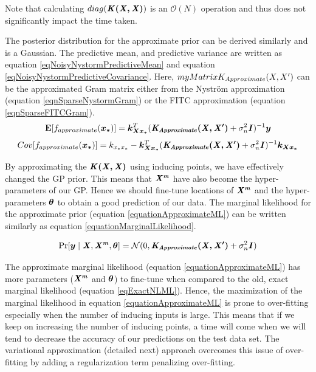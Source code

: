 Note that calculating $diag(\bm{\mathit{K(X, X)}})$ is an $\mathcal{O}\left ( N \right )$ operation and thus does not significantly impact the time taken. 

The posterior distribution for the approximate prior can be derived similarly \cite{williams2001using} and is a Gaussian. The predictive mean, and predictive variance are written as equation \ref{eqNoisyNystormPredictiveMean} and equation \ref{eqNoisyNystormPredictiveCovariance}. Here, $\\myMatrix{K_{Approximate}(X, X')}$ can be the approximated Gram matrix either from the Nystr\"{o}m approximation (equation \ref{eqnSparseNystormGram}) or the FITC approximation (equation \ref{eqnSparseFITCGram}). 
\begin{equation}\label{eqNoisyNystormPredictiveMean}
  \mathbf{E}[f_{approximate}(\boldsymbol{x_{*}})] = \boldsymbol{k_{Xx_{*}}}^{T}( \bm{\mathit{K_{Approximate}(X, X')}} + \sigma^{2}_{n}\bm{\mathit{I}})^{-1} \boldsymbol{y}
  \end{equation}
\begin{equation}\label{eqNoisyNystormPredictiveCovariance}
	Cov[f_{approximate}(\boldsymbol{x_{*}})] = k_{x_{*}x_{*}} - \boldsymbol{k_{Xx_{*}}}^{T}( \bm{\mathit{K_{Approximate}(X, X')}} + \sigma^{2}_{n}\bm{\mathit{I}} )^{-1} \boldsymbol{k_{Xx_{*}}}
  \end{equation}


By approximating the $\bm{\mathit{K(X, X)}}$ using inducing points, we have effectively changed the GP prior. This means that $\bm{\mathit{X^{m}}}$ have also become the hyper-parameters of our GP. Hence we should fine-tune locations of $\bm{\mathit{X^{m}}}$ and the hyper-parameters $\boldsymbol{\theta}$ to obtain a good prediction of our data. The marginal likelihood for the approximate prior (equation \ref{equationApproximateML}) can be written similarly as equation \ref{equationMarginalLikelihood}.

\begin{equation}\label{equationApproximateML}
    \Pr[\boldsymbol{y} \mid \bm{\mathit{X}}, \bm{\mathit{X^{m}}}, \boldsymbol{\theta}] = \mathcal{N}(0 , \bm{\mathit{K_{Approximate}(X, X')}} + \sigma^{2}_{n}\bm{\mathit{I}})
\end{equation}

The approximate marginal likelihood (equation \ref{equationApproximateML}) has more parameters ($\bm{\mathit{X^{m}}}$ and $\boldsymbol{\theta}$) to fine-tune when compared to the old, exact marginal likelihood (equation \ref{eqExactNLML}). Hence, the maximization of the marginal likelihood in equation \ref{equationApproximateML} is prone to over-fitting especially when the number of inducing inputs is large. This means that if we keep on increasing the number of inducing points, a time will come when we will tend to decrease the accuracy of our predictions on the test data set. The variational approximation (detailed next) approach overcomes this issue of over-fitting by adding a regularization term penalizing over-fitting.

